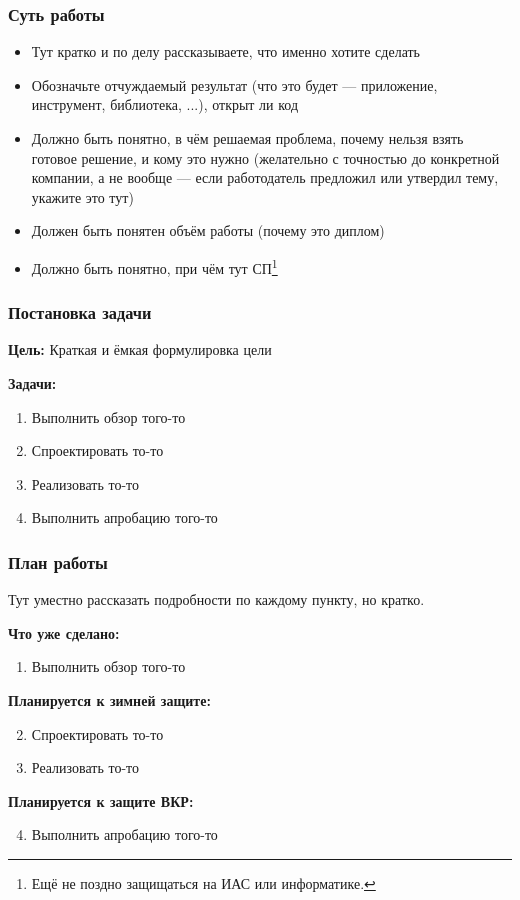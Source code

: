 \documentclass{vkr-slides-style}
\begin{document}
\makeslidestitle

\begin{frame}  
    \frametitle{Суть работы}
    \begin{itemize}
        \item Тут кратко и по делу рассказываете, что именно хотите сделать
        \item Обозначьте отчуждаемый результат (что это будет --- приложение, инструмент, библиотека, ...), открыт ли код
        \item Должно быть понятно, в чём решаемая проблема, почему нельзя взять готовое решение, и кому это нужно (желательно с точностью до конкретной компании, а не вообще --- если работодатель предложил или утвердил тему, укажите это тут)
        \item Должен быть понятен объём работы (почему это диплом)
        \item Должно быть понятно, при чём тут СП\footnote{Ещё не поздно защищаться на ИАС или информатике.}
    \end{itemize}
\end{frame}

\begin{frame}  
    \frametitle{Постановка задачи}
    \textbf{Цель:} Краткая и ёмкая формулировка цели

    \vspace{5mm}
    \textbf{Задачи:}
    \begin{enumerate}
        \item Выполнить обзор того-то
        \item Спроектировать то-то
        \item Реализовать то-то
        \item Выполнить апробацию того-то
    \end{enumerate}
\end{frame}

\begin{frame}  
    \frametitle{План работы}
    Тут уместно рассказать подробности по каждому пункту, но кратко.
    
    \textbf{Что уже сделано:}
    \begin{enumerate}
        \item Выполнить обзор того-то
    \end{enumerate}

    \textbf{Планируется к зимней защите:}
    \begin{enumerate}
        \setcounter{enumi}{1}
        \item Спроектировать то-то
        \item Реализовать то-то
    \end{enumerate}

    \textbf{Планируется к защите ВКР:}
    \begin{enumerate}
        \setcounter{enumi}{3}
        \item Выполнить апробацию того-то
    \end{enumerate}
\end{frame}
\end{document}
